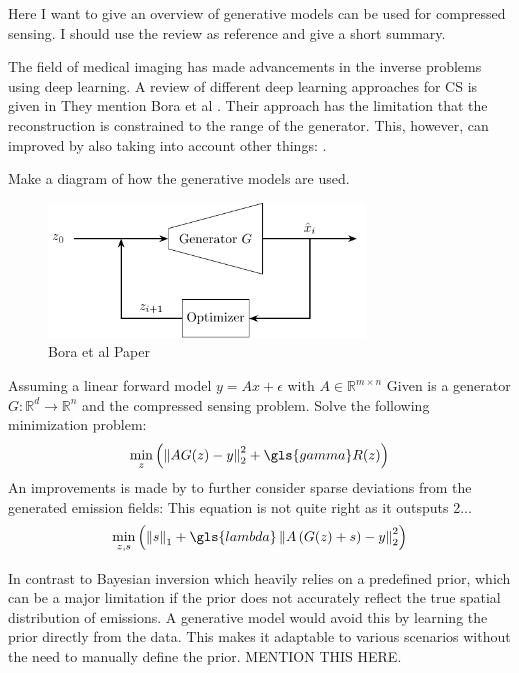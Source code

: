 Here I want to give an overview of generative models can be used for compressed sensing.
I should use the review as reference and give a short summary.

The field of medical imaging has made advancements in the inverse problems using deep learning.
A review of different deep learning approaches for CS is given in \parencite{ReviewCSUsingAI}
They mention Bora et al \parencite{CSUsingAI}.
Their approach has the limitation that the reconstruction is constrained to the range of the generator.
This, however, can improved by also taking into account other things: \parencite{SparseCSUsingAI}.

Make a diagram of how the generative models are used.
\begin{figure}[h!]
    \centering
    \includegraphics[width=0.75\textwidth]{figures/02_related_work/latent_variable_optimization/build/latent_variable_optimization.pdf}
    \caption{Bora et al Paper}
\end{figure}

Assuming a linear forward model $y = Ax + \epsilon$ with $A \in \mathbb{R}^{m \times n}$
Given is a generator $G: \mathbb{R}^d \to \mathbb{R}^n$ and the compressed sensing problem.
Solve the following minimization problem:
\begin{equation}
    \min_{z}{\left( \norm{A G(z) - y}_2^2 + \gls{gamma} R(z) \right)}
\end{equation}
An improvements is made by to further consider sparse deviations from the generated emission fields:
This equation is not quite right as it outsputs 2...
\begin{equation}
    \min_{z, s}{\left(\norm{s}_1 + \gls{lambda} \norm{A \left( G(z) + s \right) - y}_2^2 \right)}
\end{equation}

In contrast to Bayesian inversion which heavily relies on a predefined prior, which can be a major limitation if the prior does not accurately reflect the true spatial distribution of emissions.
A generative model would avoid this by learning the prior directly from the data.
This makes it adaptable to various scenarios without the need to manually define the prior.
MENTION THIS HERE.

